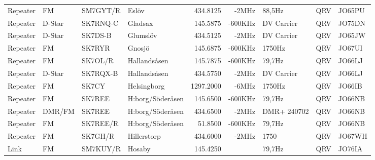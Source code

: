 \begin{landscape}
\begin{longtable}{llllrrlcl}
	Repeater                  & FM            & SM7GYT/R      & Eslöv               & 434.8125          & -2MHz          & 88,5Hz           & QRV             & JO65PU           \\
	Repeater                  & D-Star        & SK7RNQ-C      & Gladsax             & 145.5875          & -600KHz        & DV Carrier       & QRV             & JO75DN           \\
	Repeater                  & D-Star        & SK7DS-B       & Glumslöv            & 434.5125          & -2MHz          & DV Carrier       & QRV             & JO65JW           \\
	Repeater                  & FM            & SK7RYR        & Gnosjö              & 145.6875          & -600KHz        & 1750Hz           & QRV             & JO67UI           \\
	Repeater                  & FM            & SK7OL/R       & Hallandsåsen        & 145.7875          & -600KHz        & 79,7Hz           & QRV             & JO66LJ           \\
	Repeater                  & D-Star        & SK7RQX-B      & Hallandsåsen        & 434.5750          & -2MHz          & DV Carrier       & QRV             & JO66LJ           \\
	Repeater                  & FM            & SK7CY         & Helsingborg         & 1297.2000         & -6MHz          & 1750Hz           & QRV             & JO66IB           \\
	Repeater                  & FM            & SK7REE        & H:borg/Söderåsen    & 145.6500          & -600KHz        & 79,7Hz           & QRV             & JO66NB           \\
	Repeater                  & DMR/FM        & SK7REE        & H:borg/Söderåsen    & 434.6500          & -2MHz          & DMR+ 240702      & QRV             & JO66NB           \\
	Repeater                  & FM            & SK7REE/R      & H:borg/Söderåsen    & 51.8500           & -600KHz        & 79,7Hz           & QRV             & JO66NB           \\
	Repeater                  & FM            & SK7GH/R       & Hillerstorp         & 434.6000          & -2MHz          & 1750             & QRV             & JO67WH           \\
	Link                      & FM            & SM7KUY/R      & Hosaby              & 145.4250          &                & 79,7Hz           & QRV             & JO76IA           \\

\end{longtable}
\end{landscape}
